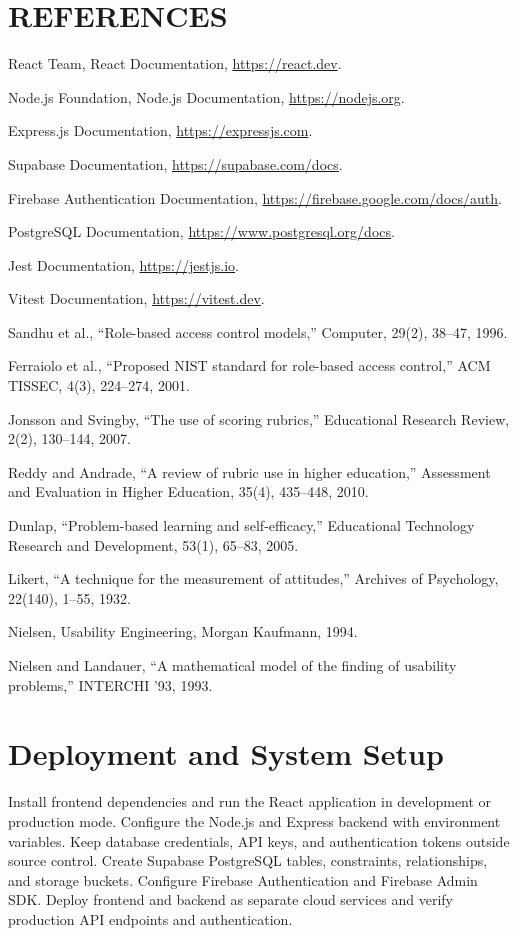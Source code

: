 \documentclass[12pt,a4paper]{report}
\begin{document}
\clearpage\chapter*{REFERENCES}
\begin{enumerate}[label={[\arabic*]}]\item React Team, React Documentation, \url{https://react.dev}.\item Node.js Foundation, Node.js Documentation, \url{https://nodejs.org}.\item Express.js Documentation, \url{https://expressjs.com}.\item Supabase Documentation, \url{https://supabase.com/docs}.\item Firebase Authentication Documentation, \url{https://firebase.google.com/docs/auth}.\item PostgreSQL Documentation, \url{https://www.postgresql.org/docs}.\item Jest Documentation, \url{https://jestjs.io}.\item Vitest Documentation, \url{https://vitest.dev}.\item Sandhu et al., ``Role-based access control models,'' Computer, 29(2), 38--47, 1996.\item Ferraiolo et al., ``Proposed NIST standard for role-based access control,'' ACM TISSEC, 4(3), 224--274, 2001.\item Jonsson and Svingby, ``The use of scoring rubrics,'' Educational Research Review, 2(2), 130--144, 2007.\item Reddy and Andrade, ``A review of rubric use in higher education,'' Assessment and Evaluation in Higher Education, 35(4), 435--448, 2010.\item Dunlap, ``Problem-based learning and self-efficacy,'' Educational Technology Research and Development, 53(1), 65--83, 2005.\item Likert, ``A technique for the measurement of attitudes,'' Archives of Psychology, 22(140), 1--55, 1932.\item Nielsen, Usability Engineering, Morgan Kaufmann, 1994.\item Nielsen and Landauer, ``A mathematical model of the finding of usability problems,'' INTERCHI '93, 1993.\end{enumerate}

\clearpage\appendix\chapter{Deployment and System Setup}
Install frontend dependencies and run the React application in development or production mode. Configure the Node.js and Express backend with environment variables. Keep database credentials, API keys, and authentication tokens outside source control. Create Supabase PostgreSQL tables, constraints, relationships, and storage buckets. Configure Firebase Authentication and Firebase Admin SDK. Deploy frontend and backend as separate cloud services and verify production API endpoints and authentication.
\end{document}
